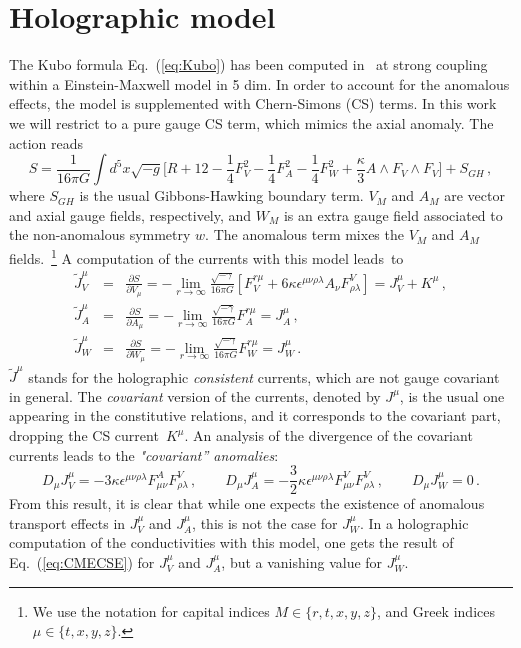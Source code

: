 \documentclass[epj]{webofc}
\begin{document}
\section{Holographic model}
\label{sec:holo_model}

The Kubo formula Eq.~(\ref{eq:Kubo}) has been computed in~\cite{Landsteiner:2011iq,Landsteiner:2011tf,Landsteiner:2013aba} at strong coupling within a Einstein-Maxwell model in 5 dim.  In order to account for the anomalous effects, the model is supplemented with Chern-Simons (CS) terms. In this work we will restrict to a pure gauge CS term, which mimics the axial anomaly. The action reads
\begin{equation}
  S = \frac{1}{16\pi G} \int d^5x \sqrt{-g} \bigg[ R + 12  - \frac{1}{4} F_V^2 - \frac{1}{4} F_A^2 - \frac{1}{4} F_W^2 + \frac{\kappa}{3} A \wedge F_V \wedge F_V  \bigg]  + S_{GH} \,, \label{eq:S}
\end{equation}
where $S_{GH}$ is the usual Gibbons-Hawking boundary term. $V_M$ and $A_M$ are vector and axial gauge fields, respectively, and $W_M$ is an extra gauge field associated to the non-anomalous symmetry $w$. The anomalous term mixes the $V_M$ and $A_M$ fields.~\footnote{We use the notation for capital indices $M \in \{r,t,x,y,z\}$, and Greek indices $\mu \in \{t,x,y,z\}$.} A computation of the currents with this model leads~to
\begin{eqnarray}
\tilde{J}_V^\mu &=& \frac{\partial S}{\partial V_\mu}  =  -\lim_{r\to \infty} \frac{\sqrt{-\gamma}}{16\pi G} \left[  F_V^{r \mu} + 6\kappa \epsilon^{\mu\nu\rho\lambda} A_\nu F^V_{\rho\lambda} \right] = J_V^\mu + K^\mu \,, \label{eq:JV} \\
\tilde{J}_A^\mu &=& \frac{\partial S}{\partial A_\mu}  = -\lim_{r\to \infty} \frac{\sqrt{-\gamma}}{16\pi G}  F_A^{r \mu} = J_A^\mu  \,, \\
\tilde{J}_W^\mu &=& \frac{\partial S}{\partial W_\mu}  = -\lim_{r\to \infty} \frac{\sqrt{-\gamma}}{16\pi G} F_W^{r \mu} = J_W^\mu \,.
\end{eqnarray}
$\tilde{J}^\mu$ stands for the holographic {\it consistent} currents, which are not gauge covariant in general. The {\it covariant} version of the currents, denoted by $J^\mu$, is the usual one appearing in the constitutive relations, and it corresponds to the covariant part, dropping the CS current~$K^\mu$. An analysis of the divergence of the covariant currents leads to the {\it "covariant'' anomalies}:
\begin{equation}
D_\mu J_{V}^\mu =  -3\kappa \epsilon^{\mu\nu\rho\lambda} F^A_{\mu\nu} F^V_{\rho\lambda} \,, \qquad D_\mu J_{A}^\mu = -\frac{3}{2}\kappa \epsilon^{\mu\nu\rho\lambda} F^V_{\mu\nu} F^V_{\rho\lambda} \,,  \qquad D_\mu J_{W}^\mu = 0  \,.
\end{equation}
From this result, it is clear that while one expects the existence of anomalous transport effects in $J_{V}^\mu$ and $J_{A}^\mu$, this is not the case for $J_{W}^\mu$. In a holographic computation of the conductivities with this model, one gets the result of Eq.~(\ref{eq:CMECSE}) for $J_V^\mu$ and $J_A^\mu$, but a vanishing value for $J_W^\mu$.
\end{document}
